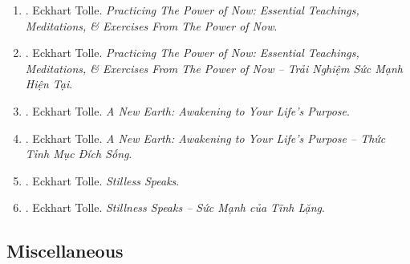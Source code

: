 \documentclass{article}
\begin{document}
\begin{enumerate}
	\item \cite{Tolle_practice_now}. {\sc Eckhart Tolle}. {\it Practicing The Power of Now: Essential Teachings, Meditations, \& Exercises From The Power of Now}.

	\item \cite{Tolle_practice_now_VN}. {\sc Eckhart Tolle}. {\it Practicing The Power of Now: Essential Teachings, Meditations, \& Exercises From The Power of Now -- Trải Nghiệm Sức Mạnh Hiện Tại}.\hfill{\sf[done]}

	\item \cite{Tolle_earth}. {\sc Eckhart Tolle}. {\it A New Earth: Awakening to Your Life's Purpose}.

	\item \cite{Tolle_earth_VN}. {\sc Eckhart Tolle}. {\it A New Earth: Awakening to Your Life's Purpose -- Thức Tỉnh Mục Đích Sống}.\hfill{\sf[done]}

	\item \cite{Tolle_stillness}. {\sc Eckhart Tolle}. {\it Stilless Speaks}.

	\item \cite{Tolle_stillness_VN}. {\sc Eckhart Tolle}. {\it Stillness Speaks -- Sức Mạnh của Tĩnh Lặng}.\hfill{\sf[done]}
\end{enumerate}


\subsection{Miscellaneous}
\end{document}
